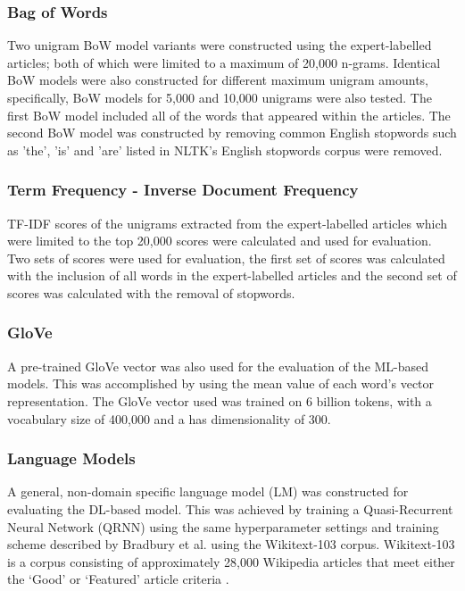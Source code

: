 \documentclass[a4paper,twoside,phd]{BYUPhys}
\begin{document}
\subsubsection{Bag of Words}
\label{sec:FeatureSelectionBoW}
Two unigram BoW model variants were constructed using the expert-labelled articles; both of which were limited to a maximum of 20,000 n-grams. Identical BoW models were also constructed for different maximum unigram amounts, specifically, BoW models for 5,000 and 10,000 unigrams were also tested. The first BoW model included all of the words that appeared within the articles. The second BoW model was constructed by removing common English stopwords such as 'the', 'is' and 'are' listed in NLTK's English stopwords corpus \cite{Bird2009} were removed.

\subsubsection{Term Frequency - Inverse Document Frequency}
\label{sec:FeatureSelectionTFIDF}
TF-IDF scores of the unigrams extracted from the expert-labelled articles which were limited to the top 20,000 scores were calculated and used for evaluation. Two sets of scores were used for evaluation, the first set of scores was calculated with the inclusion of all words in the expert-labelled articles and the second set of scores was calculated with the removal of stopwords.

\subsubsection{GloVe}
\label{sec:FeatureSelectionGloVe}

A pre-trained GloVe vector \cite{pennington2014glove} was also used for the evaluation of the ML-based models. This was accomplished by using the mean value of each word's vector representation. The GloVe vector used was trained on 6 billion tokens, with a vocabulary size of 400,000 and a has dimensionality of 300.

\subsubsection{Language Models}
\label{sec:FeatureSelectionLM}

A general, non-domain specific language model (LM) was constructed for evaluating the DL-based model. This was achieved by training a Quasi-Recurrent Neural Network (QRNN) using the same hyperparameter settings and training scheme described by Bradbury et al. \cite{bradbury2016quasi} using the Wikitext-103 corpus. Wikitext-103 is a corpus consisting of approximately 28,000 Wikipedia articles that meet either the `Good' or `Featured' article criteria \cite{Merity2016}. \newline
\end{document}

